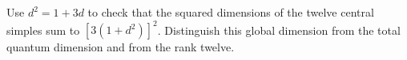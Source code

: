 \begin{exercise}\label{ex:c-branch-6}
Use $d^2=1+3d$ to check that the squared dimensions of the twelve
central simples sum to $[3(1+d^2)]^2$. Distinguish this global
dimension from the total quantum dimension and from the rank twelve.

\par\smallskip{}\par
\end{exercise}
